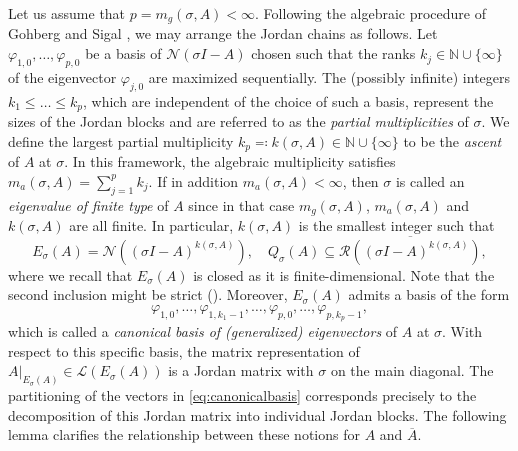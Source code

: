 \documentclass[english]{myarticle}
\begin{document}
\begin{sloppypar}
Let us assume that $p = m_g(\sigma,A) < \infty$. Following the algebraic procedure of Gohberg and Sigal \cite{Gohberg1971}, we may arrange the Jordan chains as follows. Let $\varphi_{1,0},\dots,\varphi_{p,0}$ be a basis of $\mathcal{N}(\sigma I - A)$ chosen such that the ranks $k_j \in \mathbb{N} \cup \{\infty\}$ of the eigenvector $\varphi_{j,0}$ are maximized sequentially. The (possibly infinite) integers $k_1 \leq \dots \leq k_p$, which are independent of the choice of such a basis, represent the sizes of the Jordan blocks and are referred to as the \emph{partial multiplicities} of $\sigma$. We define the largest partial multiplicity $k_p \eqqcolon k(\sigma,A) \in \mathbb{N} \cup \{\infty\}$ to be the \emph{ascent} of $A$ at $\sigma$. In this framework, the algebraic multiplicity satisfies $m_a(\sigma,A) = \sum_{j=1}^p k_j$. If in addition $m_a(\sigma,A) < \infty$, then $\sigma$ is called an \emph{eigenvalue of finite type} of $A$ since in that case $m_g(\sigma,A)$, $m_a(\sigma,A)$ and $k(\sigma,A)$ are all finite. In particular, $k(\sigma,A)$ is the smallest integer such that 
\begin{equation} \label{eq:EsigmaQsigma}
    E_\sigma(A) = \mathcal{N}((\sigma I - A)^{k(\sigma,A)}), \quad Q_\sigma(A) \subseteq \overline{\mathcal{R}((\sigma I - A)^{k(\sigma,A)})},
\end{equation}
where we recall that $E_\sigma(A)$ is closed as it is finite-dimensional. Note that the second inclusion might be strict (\cite[Problem 5.4.2]{Taylor1986}). Moreover, $E_\sigma(A)$ admits a basis of the form
\begin{equation} \label{eq:canonicalbasis}
\varphi_{1,0},\dots,\varphi_{1,k_1-1},\dots,\varphi_{p,0},\dots,\varphi_{p,k_p-1},
\end{equation}
which is called a \emph{canonical basis of (generalized) eigenvectors} of $A$ at $\sigma$. With respect to this specific basis, the matrix representation of $A|_{E_\sigma(A)} \in \mathcal{L}(E_{\sigma}(A))$ is a Jordan matrix with $\sigma$ on the main diagonal. The partitioning of the vectors in \eqref{eq:canonicalbasis} corresponds precisely to the decomposition of this Jordan matrix into individual Jordan blocks. The following lemma clarifies the relationship between these notions for $A$ and $\overline{A}$.


\end{sloppypar}
\end{document}
